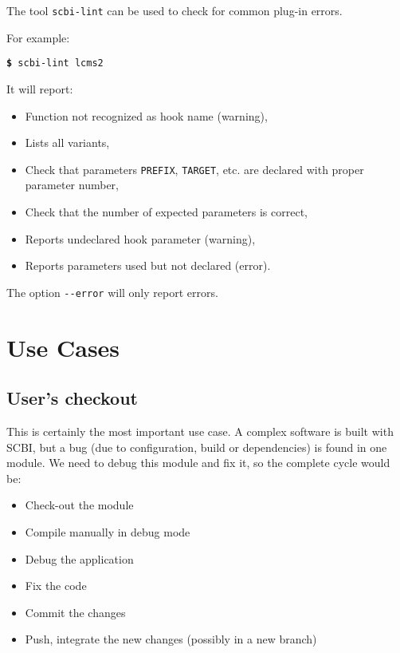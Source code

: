 \documentclass[a4paper,12pt,twoside]{article}
\newcommand{\code}[1]{\texttt{#1}}
\newcommand{\cmd}[1]{\tabto{1cm}\hspace{0.5cm}\texttt{\textbf{\$} #1}}
\let\stdsection\section
\renewcommand\section{\newpage\stdsection}
\newcommand{\ddash}{-{}-}
\begin{document}
The tool \code{scbi-lint} can be used to check for common plug-in errors.

For example:

\cmd{scbi-lint lcms2}

It will report:

\begin{itemize}
	\item Function not recognized as hook name (warning),
	\item Lists all variants,
	\item Check that parameters \code{PREFIX}, \code{TARGET}, etc. are declared with proper parameter number,
	\item Check that the number of expected parameters is correct,
	\item Reports undeclared hook parameter (warning),
	\item Reports parameters used but not declared (error).
\end{itemize}

The option \code{\ddash{}error} will only report errors.


\section{Use Cases}

\subsection{User's checkout}
\label{userco}

This is certainly the most important use case. A complex software is built with SCBI, but a bug (due to configuration, build or dependencies) is found in one module. We need to debug this module and fix it, so the complete cycle would be:

\begin{itemize}
	\item Check-out the module
	\item Compile manually in debug mode
	\item Debug the application
	\item Fix the code
	\item Commit the changes
	\item Push, integrate the new changes (possibly in a new branch)
\end{itemize}
\end{document}
